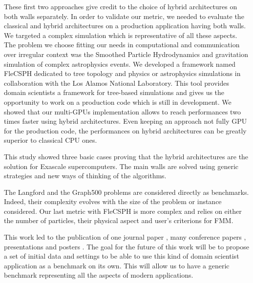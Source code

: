 These first two approaches give credit to the choice of hybrid architectures on both walls separately. 
In order to validate our metric, we needed to evaluate the classical and hybrid architectures on a production application having both walls. 
We targeted a complex simulation which is representative of all these aspects. 
The problem we choose fitting our needs in computational and communication over irregular context was the Smoothed Particle Hydrodynamics and gravitation simulation of complex astrophysics events.  
We developed a framework named FleCSPH dedicated to tree topology and physics or astrophysics simulations in collaboration with the Los Alamos National Laboratory.
This tool provides domain scientists a framework for tree-based simulations and gives us the opportunity to work on a production code which is still in development. 
We showed that our multi-GPUs implementation allows to reach performances two times faster using hybrid architectures. 
Even keeping an approach not fully GPU for the production code, the performances on hybrid architectures can be greatly superior to classical CPU ones. 

This study showed three basic cases proving that the hybrid architectures are the solution for Exascale supercomputers.
The main walls are solved using generic strategies and new ways of thinking of the algorithms. 

The Langford and the Graph500 problems are considered directly as benchmarks.
Indeed, their complexity evolves with the size of the problem or instance considered.  
Our last metric with FleCSPH is more complex and relies on either the number of particles, their physical aspect and user's criterions for FMM.

This work led to the publication of one journal paper \cite{krajecki2016many}, many conference papers \cite{krajecki2016bfs,loiseau2018Flecsphg,loiseau2018CARLA,loiseau2018Flecsphg,loiseau2018CARLA}, presentations and posters \cite{deleau2014towards,j2016resolution,jaillet2014Langford,loiseau2015parcours,loiseau2015GTC,debrye20162HOT,loiseau2017SC}.
The goal for the future of this work will be to propose a set of initial data and settings to be able to use this kind of domain scientist application as a benchmark on its own.
This will allow us to have a generic benchmark representing all the aspects of modern applications.\\

